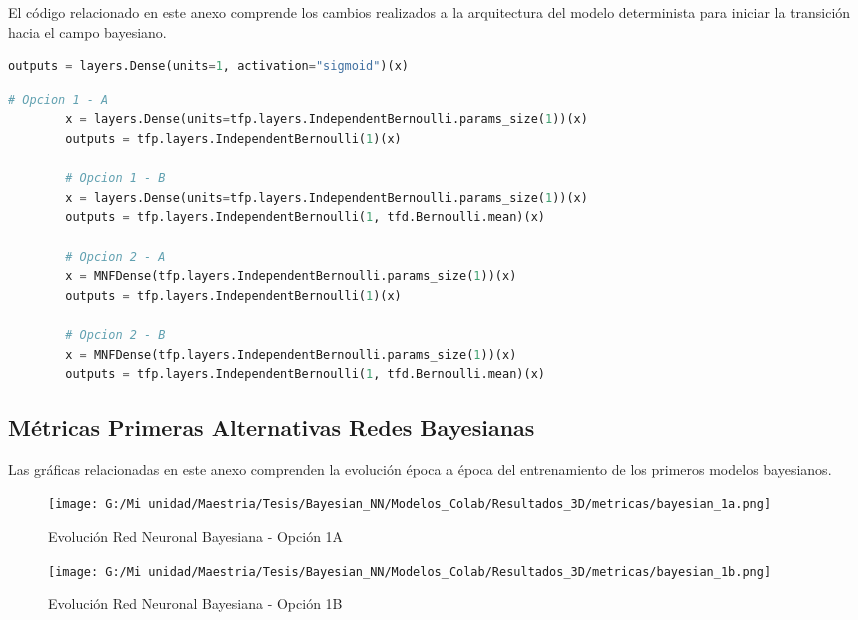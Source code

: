 \documentclass[10pt, oneside, a4paper]{article}
\begin{document}
	El código relacionado en este anexo comprende los cambios realizados a la arquitectura del modelo determinista para iniciar la transición hacia el campo bayesiano.
	
	\begin{adjustbox}{max width=\textwidth}
	\begin{lstlisting}[language=Python, caption={Capa Final - Modelo determinista:}]
		outputs = layers.Dense(units=1, activation="sigmoid")(x)
	\end{lstlisting}
	\end{adjustbox}

	\begin{adjustbox}{max width=\textwidth}
	\begin{lstlisting}[language=Python, caption={Alternativa para Modelo Bayesiano:}]
		# Opcion 1 - A
		x = layers.Dense(units=tfp.layers.IndependentBernoulli.params_size(1))(x)
		outputs = tfp.layers.IndependentBernoulli(1)(x)
		
		# Opcion 1 - B
		x = layers.Dense(units=tfp.layers.IndependentBernoulli.params_size(1))(x)
		outputs = tfp.layers.IndependentBernoulli(1, tfd.Bernoulli.mean)(x)
		
		# Opcion 2 - A
		x = MNFDense(tfp.layers.IndependentBernoulli.params_size(1))(x)
		outputs = tfp.layers.IndependentBernoulli(1)(x)
		
		# Opcion 2 - B
		x = MNFDense(tfp.layers.IndependentBernoulli.params_size(1))(x)
		outputs = tfp.layers.IndependentBernoulli(1, tfd.Bernoulli.mean)(x)
	\end{lstlisting}
	\end{adjustbox}

	\subsection{Métricas Primeras Alternativas Redes Bayesianas} \label{metricas_bayesiana_1}
	
	Las gráficas relacionadas en este anexo comprenden la evolución época a época del entrenamiento de los primeros modelos bayesianos.
	
	\begin{figure}[H]
	\centering
	\texttt{[image: G:/Mi unidad/Maestria/Tesis/Bayesian\_NN/Modelos\_Colab/Resultados\_3D/metricas/bayesian\_1a.png]}
	\caption{Evolución Red Neuronal Bayesiana - Opción 1A}
	\label{fig:bayesian_1}
	\end{figure}
	
	\begin{figure}[H]
		\centering
		\texttt{[image: G:/Mi unidad/Maestria/Tesis/Bayesian\_NN/Modelos\_Colab/Resultados\_3D/metricas/bayesian\_1b.png]}
		\caption{Evolución Red Neuronal Bayesiana - Opción 1B}
		\label{fig:bayesian_2}
	\end{figure}
	
\end{document}
